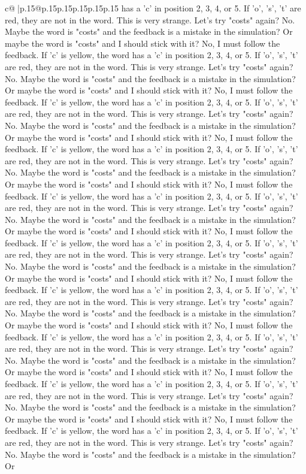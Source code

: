 \documentclass{article}
\begin{document}
{\begin{supertabular}{c@{$\;$}|p{.15\linewidth}@{}p{.15\linewidth}p{.15\linewidth}p{.15\linewidth}p{.15\linewidth}p{.15\linewidth}}
{{{has a 'c' in position 2, 3, 4, or 5. If 'o', 's', 't' are red, they are not in the word. This is very strange. Let's try "costs" again? No. Maybe the word is "costs" and the feedback is a mistake in the simulation? Or maybe the word is "costs" and I should stick with it? No, I must follow the feedback. If 'c' is yellow, the word has a 'c' in position 2, 3, 4, or 5. If 'o', 's', 't' are red, they are not in the word. This is very strange. Let's try "costs" again? No. Maybe the word is "costs" and the feedback is a mistake in the simulation? Or maybe the word is "costs" and I should stick with it? No, I must follow the feedback. If 'c' is yellow, the word has a 'c' in position 2, 3, 4, or 5. If 'o', 's', 't' are red, they are not in the word. This is very strange. Let's try "costs" again? No. Maybe the word is "costs" and the feedback is a mistake in the simulation? Or maybe the word is "costs" and I should stick with it? No, I must follow the feedback. If 'c' is yellow, the word has a 'c' in position 2, 3, 4, or 5. If 'o', 's', 't' are red, they are not in the word. This is very strange. Let's try "costs" again? No. Maybe the word is "costs" and the feedback is a mistake in the simulation? Or maybe the word is "costs" and I should stick with it? No, I must follow the feedback. If 'c' is yellow, the word has a 'c' in position 2, 3, 4, or 5. If 'o', 's', 't' are red, they are not in the word. This is very strange. Let's try "costs" again? No. Maybe the word is "costs" and the feedback is a mistake in the simulation? Or maybe the word is "costs" and I should stick with it? No, I must follow the feedback. If 'c' is yellow, the word has a 'c' in position 2, 3, 4, or 5. If 'o', 's', 't' are red, they are not in the word. This is very strange. Let's try "costs" again? No. Maybe the word is "costs" and the feedback is a mistake in the simulation? Or maybe the word is "costs" and I should stick with it? No, I must follow the feedback. If 'c' is yellow, the word has a 'c' in position 2, 3, 4, or 5. If 'o', 's', 't' are red, they are not in the word. This is very strange. Let's try "costs" again? No. Maybe the word is "costs" and the feedback is a mistake in the simulation? Or maybe the word is "costs" and I should stick with it? No, I must follow the feedback. If 'c' is yellow, the word has a 'c' in position 2, 3, 4, or 5. If 'o', 's', 't' are red, they are not in the word. This is very strange. Let's try "costs" again? No. Maybe the word is "costs" and the feedback is a mistake in the simulation? Or maybe the word is "costs" and I should stick with it? No, I must follow the feedback. If 'c' is yellow, the word has a 'c' in position 2, 3, 4, or 5. If 'o', 's', 't' are red, they are not in the word. This is very strange. Let's try "costs" again? No. Maybe the word is "costs" and the feedback is a mistake in the simulation? Or maybe the word is "costs" and I should stick with it? No, I must follow the feedback. If 'c' is yellow, the word has a 'c' in position 2, 3, 4, or 5. If 'o', 's', 't' are red, they are not in the word. This is very strange. Let's try "costs" again? No. Maybe the word is "costs" and the feedback is a mistake in the simulation? Or }}}
\end{supertabular}}
\end{document}
